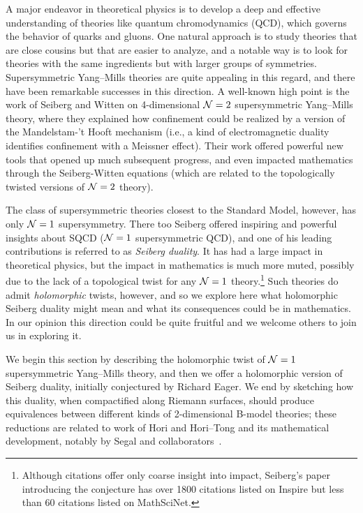 \documentclass[11pt]{amsart}
\begin{document}
A major endeavor in theoretical physics is to develop a deep and effective understanding of theories like quantum chromodynamics (QCD), which governs the behavior of quarks and gluons.
One natural approach is to study theories that are close cousins but that are easier to analyze,
and a notable way is to look for theories with the same ingredients but with larger groups of symmetries.
Supersymmetric Yang--Mills theories are quite appealing in this regard,
and there have been remarkable successes in this direction.
A well-known high point is the work of Seiberg and Witten on 4-dimensional $\mathcal N =2$ supersymmetric Yang--Mills theory,
where they explained how confinement could be realized by a version of the Mandelstam-'t Hooft mechanism (i.e., a kind of electromagnetic duality identifies confinement with a Meissner effect).
Their work offered powerful new tools that opened up much subsequent progress,
and even impacted mathematics through the Seiberg-Witten equations (which are related to the topologically twisted versions of $\mathcal N=2$ theory).

The class of supersymmetric theories closest to the Standard Model, however, has only $\mathcal N=1$ supersymmetry.
There too Seiberg offered inspiring and powerful insights about SQCD ($\mathcal N=1$ supersymmetric QCD),
and one of his leading contributions is referred to as {\em Seiberg duality}.
It has had a large impact in theoretical physics,
but the impact in mathematics is much more muted,
possibly due to the lack of a topological twist for any $\mathcal N=1$ theory.\footnote{Although citations offer only coarse insight into impact, Seiberg's paper introducing the conjecture \cite{Seiberg} has over 1800 citations listed on Inspire but less than 60 citations listed on MathSciNet.}
Such theories do admit {\em holomorphic} twists, however, 
and so we explore here what holomorphic Seiberg duality might mean and what its consequences could be in mathematics.
In our opinion this direction could be quite fruitful and we welcome others to join us in exploring it.

We begin this section by describing the holomorphic twist of $\mathcal N=1$ supersymmetric Yang--Mills theory,
and then we offer a holomorphic version of Seiberg duality, 
initially conjectured by Richard Eager.
We end by sketching how this duality, when compactified along Riemann surfaces,
should produce equivalences between different kinds of 2-dimensional B-model theories;
these reductions are related to work of Hori and Hori--Tong and its mathematical development, notably by Segal and collaborators~\cite{Hori, HoriTong, HMSegRen, ADS}.
\end{document}
